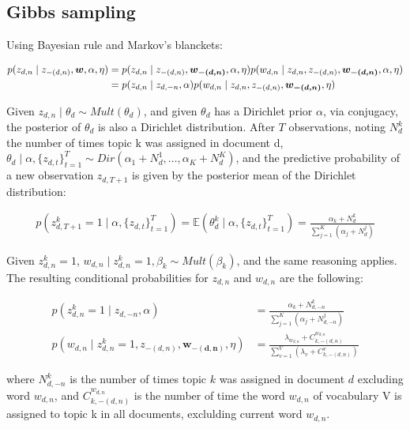 \documentclass[12pt,a4paper,onecolumn]{article}
\begin{document}
\subsection{Gibbs sampling}

Using Bayesian rule and Markov's blanckets:

\begin{align}
	p(z_{d,n} \mid z_{-(d,n)}, \bm{w}, \alpha, \eta) &= p(z_{d,n} \mid z_{-(d,n)}, \bm{w_{-(d,n)}}, \alpha, \eta) p(w_{d,n} \mid z_{d,n}, z_{-(d,n)}, \bm{w_{-(d,n)}}, \alpha, \eta) \notag\\
	&= p(z_{d,n} \mid z_{d,-n}, \alpha) p(w_{d,n} \mid z_{d,n}, z_{-(d,n)}, \bm{w_{-(d,n)}}, \eta)
	\label{eq_gibbs_z}
\end{align}

Given \(z_{d,n} \mid \theta_d \sim Mult(\theta_d)\), and given \(\theta_d\) has a Dirichlet prior \(\alpha\), via conjugacy, the posterior of \(\theta_d\) is also a Dirichlet distribution. After \(T\) observations, noting \(N_d^k\) the number of times topic k was assigned in document d, \(\theta_d \mid \alpha, \{z_{d,t}\}_{t=1}^T \sim Dir(\alpha_1 + N_d^1, \dots, \alpha_K + N_d^K)\), and the predictive probability of a new observation \(z_{d,{T+1}}\) is given by the posterior mean of the Dirichlet distribution:

\begin{align}
	p(z_{d,{T+1}}^k = 1 \mid \alpha, \{z_{d,t}\}_{t=1}^T) = \mathbb{E}(\theta_d^k \mid \alpha, \{z_{d,t}\}_{t=1}^T) = \frac{\alpha_k + N_{d}^k}{\sum_{j=1}^K\left(\alpha_j + N_{d}^j\right)}
\end{align}

Given \(z_{d,n}^k = 1\), \(w_{d,n} \mid z_{d,n}^k = 1, \beta_k  \sim Mult(\beta_k)\), and the same reasoning applies. The resulting conditional probabilities for \(z_{d,n}\) and \(w_{d,n}\) are the following:

\begin{align}
	p(z_{d,n}^k = 1 \mid z_{d,-n}, \alpha) &= \frac{\alpha_k + N_{d,-n}^k}{\sum_{j=1}^K \left(\alpha_j + N_{d,-n}^j\right)} \label{eq_gibbs_cond_z}\\
		p(w_{d,n} \mid z_{d,n}^k = 1, z_{-(d,n)}, \bm{w_{-(d,n)}}, \eta) &= \frac{\lambda_{w_{d,n}} + C_{k,-(d,n)}^{w_{d,n}}}{\sum_{v=1}^V\left(\lambda_v + C_{k,-(d,n)}^{v}\right)} \label{eq_gibbs_cond_w}
\end{align}


where \(N_{d,-n}^k\) is the number of times topic \(k\) was assigned in document \(d\) excluding word \(w_{d,n}\), and \(C_{k,-(d,n)}^{w_{d,n}}\) is the number of time the word \(w_{d,n}\) of vocabulary V is assigned to topic k in all documents, exclulding current word \(w_{d,n}\).
\end{document}
